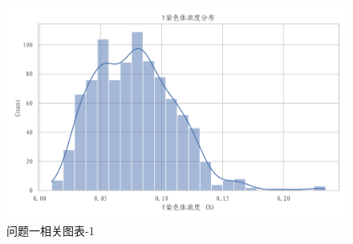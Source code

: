 \documentclass[withoutpreface,bwprint]{cumcmthesis} %
\begin{document}
\begin{appendices}
\begin{figure}[H]
        \begin{minipage}{0.49\textwidth}
            \centering
            \includegraphics[width=\textwidth]{../figure/C1_Output/hist_y_concentration.png}
        \end{minipage}
        \caption{问题一相关图表-1}
        \label{fig:q1-1}
    \end{figure}


\end{appendices}
\end{document}

